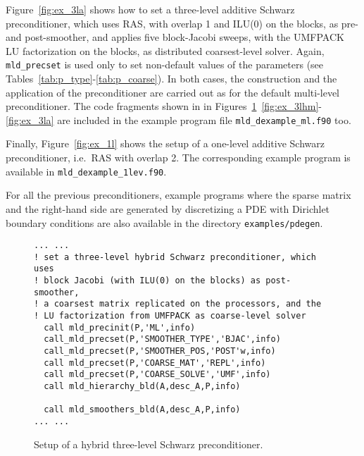 Figure~\ref{fig:ex_3la} shows how to
set a three-level additive Schwarz preconditioner,
which uses RAS, with overlap 1 and ILU(0) on the blocks, 
as pre- and post-smoother, and applies five block-Jacobi sweeps, with
the UMFPACK LU factorization on the blocks, as distributed coarsest-level
solver. Again, \verb|mld_precset| is used only to set
non-default values of the parameters (see Tables~\ref{tab:p_type}-\ref{tab:p_coarse}).
In both cases, the construction and the application of the preconditioner
are carried out as for the default multi-level preconditioner.
The code fragments shown in in
Figures~\ref{fig:ex_3lh}~\ref{fig:ex_3lhm}-\ref{fig:ex_3la} are
included in the example program file \verb|mld_dexample_ml.f90| too. 

Finally, Figure~\ref{fig:ex_1l} shows the setup of a one-level
additive Schwarz preconditioner, i.e.\ RAS with overlap 2. The
corresponding example program is available in \verb|mld_dexample_1lev.f90|. 

For all the previous preconditioners, example programs where the sparse matrix and
the right-hand side are generated by discretizing a PDE with Dirichlet
boundary conditions are also available in the directory \verb|examples/pdegen|.



\begin{figure}[tbh]
\begin{center}
\begin{minipage}{.90\textwidth} 
{\small
\begin{verbatim}
... ...
! set a three-level hybrid Schwarz preconditioner, which uses 
! block Jacobi (with ILU(0) on the blocks) as post-smoother,
! a coarsest matrix replicated on the processors, and the 
! LU factorization from UMFPACK as coarse-level solver
  call mld_precinit(P,'ML',info)
  call_mld_precset(P,'SMOOTHER_TYPE','BJAC',info)
  call_mld_precset(P,'SMOOTHER_POS,'POST'w,info)
  call mld_precset(P,'COARSE_MAT','REPL',info)
  call mld_precset(P,'COARSE_SOLVE','UMF',info)
  call mld_hierarchy_bld(A,desc_A,P,info)

  call mld_smoothers_bld(A,desc_A,P,info)
... ...
\end{verbatim}
}
\end{minipage}

\caption{Setup of a hybrid three-level Schwarz preconditioner.\label{fig:ex_3lh}}
\end{center}
\end{figure}

